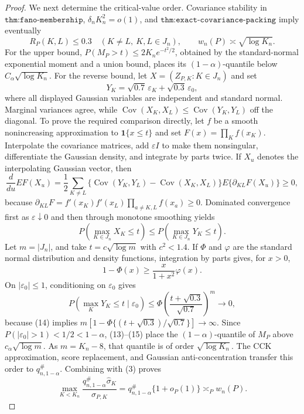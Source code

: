 \documentclass{article}
\begin{document}
\begin{proof}
We next determine the critical-value order.  Covariance stability in \(\texttt{thm:fano-membership}\), \(\delta_nK_n^2=o(1)\), and \(\texttt{thm:exact-covariance-packing}\) imply eventually
\[
 R_P(K,L)\leq0.3\quad(K\neq L,\ K,L\in J_n),
 \qquad w_n(P)\asymp\sqrt{\log K_n}.                                        \tag{11}
\]
For the upper bound, \(P(M_P>t)\leq2K_ne^{-t^2/2}\), obtained by the standard-normal exponential moment and a union bound, places its \((1-\alpha)\)-quantile below \(C_\alpha\sqrt{\log K_n}\).  For the reverse bound, let \(X=(Z_{P,K}:K\in J_n)\) and set
\[
 Y_K=\sqrt{0.7}\,\varepsilon_K+\sqrt{0.3}\,\varepsilon_0,
\]
where all displayed Gaussian variables are independent and standard normal.  Marginal variances agree, while \(\operatorname{Cov}(X_K,X_L)\leq\operatorname{Cov}(Y_K,Y_L)\) off the diagonal.  To prove the required comparison directly, let \(f\) be a smooth nonincreasing approximation to \(\mathbf1\{x\leq t\}\) and set \(F(x)=\prod_Kf(x_K)\).  Interpolate the covariance matrices, add \(\varepsilon I\) to make them nonsingular, differentiate the Gaussian density, and integrate by parts twice.  If \(X_u\) denotes the interpolating Gaussian vector, then
\[
 \frac d{du}E F(X_u)=\frac12\sum_{K\neq L}
 \{\operatorname{Cov}(Y_K,Y_L)-\operatorname{Cov}(X_K,X_L)\}
 E\{\partial_{KL}F(X_u)\}\geq0,                                            \tag{12}
\]
because \(\partial_{KL}F=f'(x_K)f'(x_L)\prod_{a\neq K,L}f(x_a)\geq0\).  Dominated convergence first as \(\varepsilon\downarrow0\) and then through monotone smoothing yields
\[
 P(\max_{K\in J_n}X_K\leq t)\leq P(\max_{K\in J_n}Y_K\leq t).             \tag{13}
\]
Let \(m=|J_n|\), and take \(t=c\sqrt{\log m}\) with \(c^2<1.4\).  If \(\Phi\) and \(\varphi\) are the standard normal distribution and density functions, integration by parts gives, for \(x>0\),
\[
 1-\Phi(x)\geq\frac{x}{1+x^2}\varphi(x).                                   \tag{14}
\]
On \(|\varepsilon_0|\leq1\), conditioning on \(\varepsilon_0\) gives
\[
 P(\max_KY_K\leq t\mid\varepsilon_0)
 \leq\Phi\!\left(\frac{t+\sqrt{0.3}}{\sqrt{0.7}}\right)^m\longrightarrow0, \tag{15}
\]
because (14) implies \(m[1-\Phi\{(t+\sqrt{0.3})/\sqrt{0.7}\}]\to\infty\).  Since \(P(|\varepsilon_0|>1)<1/2<1-\alpha\), (13)--(15) place the \((1-\alpha)\)-quantile of \(M_P\) above \(c_\alpha\sqrt{\log m}\).  As \(m=K_n-8\), that quantile is of order \(\sqrt{\log K_n}\).  The CCK approximation, score replacement, and Gaussian anti-concentration transfer this order to \(q_{n,1-\alpha}^{\#}\).  Combining with (3) proves
\[
 \max_{K<K_n}\frac{q_{n,1-\alpha}^{\#}\widehat\sigma_K}{\sigma_{P,K}}
 =q_{n,1-\alpha}^{\#}\{1+o_P(1)\}\asymp_P w_n(P).                         \tag{16}
\]


\end{proof}
\end{document}
